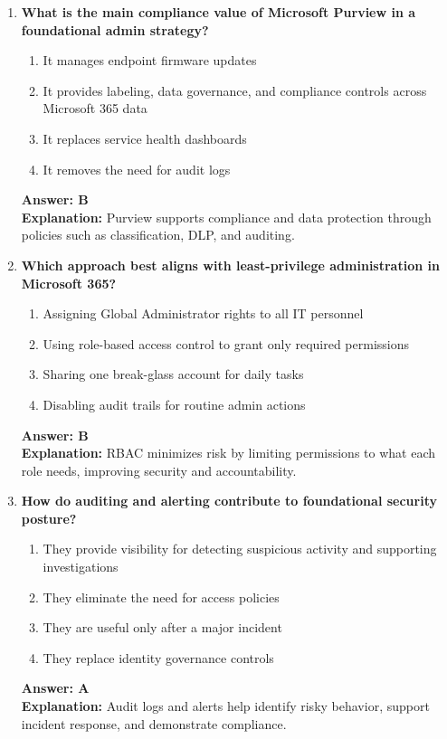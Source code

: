 \documentclass[10pt]{article}
\begin{document}
\begin{enumerate}[leftmargin=*]
\item \textbf{What is the main compliance value of Microsoft Purview in a foundational admin strategy?}
\begin{enumerate}[label=\Alph*.]
  \item It manages endpoint firmware updates
  \item It provides labeling, data governance, and compliance controls across Microsoft 365 data
  \item It replaces service health dashboards
  \item It removes the need for audit logs
\end{enumerate}
\textbf{Answer: B}\\
\textbf{Explanation:} Purview supports compliance and data protection through policies such as classification, DLP, and auditing.

\item \textbf{Which approach best aligns with least-privilege administration in Microsoft 365?}
\begin{enumerate}[label=\Alph*.]
  \item Assigning Global Administrator rights to all IT personnel
  \item Using role-based access control to grant only required permissions
  \item Sharing one break-glass account for daily tasks
  \item Disabling audit trails for routine admin actions
\end{enumerate}
\textbf{Answer: B}\\
\textbf{Explanation:} RBAC minimizes risk by limiting permissions to what each role needs, improving security and accountability.

\item \textbf{How do auditing and alerting contribute to foundational security posture?}
\begin{enumerate}[label=\Alph*.]
  \item They provide visibility for detecting suspicious activity and supporting investigations
  \item They eliminate the need for access policies
  \item They are useful only after a major incident
  \item They replace identity governance controls
\end{enumerate}
\textbf{Answer: A}\\
\textbf{Explanation:} Audit logs and alerts help identify risky behavior, support incident response, and demonstrate compliance.


\end{enumerate}
\end{document}
